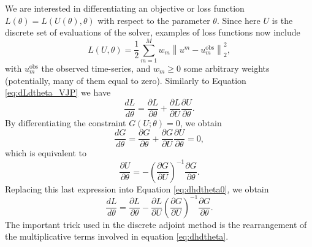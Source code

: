 We are interested in differentiating an objective or loss function $L(\theta) = L(U(\theta), \theta)$ with respect to the parameter $\theta$. 
Since here $U$ is the discrete set of evaluations of the solver, examples of loss functions now include 
\begin{equation}
    L(U, \theta) 
    = 
    \frac{1}{2} \sum_{m=1}^M w_m \left \| u^m - u_m^\text{obs} \right \|_2^2, 
\end{equation}
with $u_m^\text{obs}$ the observed time-series, and $w_m \geq 0$ some arbitrary weights (potentially, many of them equal to zero). 
Similarly to Equation \eqref{eq:dLdtheta_VJP} we have 
\begin{equation}
    \frac{dL}{d\theta} 
    = 
    \frac{\partial L}{\partial \theta} 
    + 
    \frac{\partial L}{\partial U} \frac{\partial U}{\partial \theta}.
    \label{eq:dhdtheta0}
\end{equation}
By differentiating the constraint $G(U; \theta) = 0$, we obtain
\begin{equation}
    \frac{dG}{d\theta} 
    = 
    \frac{\partial G}{\partial \theta} 
    + 
    \frac{\partial G}{\partial U} \frac{\partial U}{\partial \theta}
    =
    0,
\end{equation}
which is equivalent to 
\begin{equation}
    \frac{\partial U}{\partial \theta} 
    = 
    - \left( \frac{\partial G}{\partial U} \right)^{-1} \frac{\partial G}{\partial \theta}.
    \label{eq:adjoint-inversion-implicit-theorem}
\end{equation}
Replacing this last expression into Equation \eqref{eq:dhdtheta0}, we obtain
\begin{equation}
    \frac{dL}{d\theta} 
    =
    \frac{\partial L}{\partial \theta} 
    - 
    \frac{\partial L}{\partial U}
    \left( \frac{\partial G}{\partial U} \right)^{-1} 
    \frac{\partial G}{\partial \theta}.
    \label{eq:dhdtheta}
\end{equation}
The important trick used in the discrete adjoint method is the rearrangement of the multiplicative terms involved in equation \eqref{eq:dhdtheta}. 
